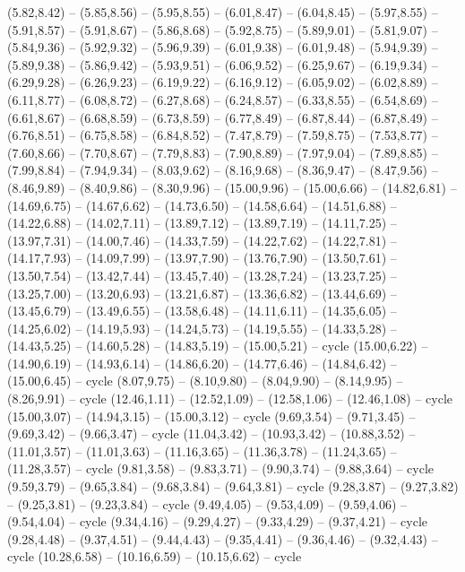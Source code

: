 {(5.82,8.42) -- (5.85,8.56) -- (5.95,8.55) -- (6.01,8.47) -- (6.04,8.45) -- (5.97,8.55) -- (5.91,8.57) -- (5.91,8.67) -- (5.86,8.68) -- (5.92,8.75) -- (5.89,9.01) -- (5.81,9.07) -- (5.84,9.36) -- (5.92,9.32) -- (5.96,9.39) -- (6.01,9.38) -- (6.01,9.48) -- (5.94,9.39) -- (5.89,9.38) -- (5.86,9.42) -- (5.93,9.51) -- (6.06,9.52) -- (6.25,9.67) -- (6.19,9.34) -- (6.29,9.28) -- (6.26,9.23) -- (6.19,9.22) -- (6.16,9.12) -- (6.05,9.02) -- (6.02,8.89) -- (6.11,8.77) -- (6.08,8.72) -- (6.27,8.68) -- (6.24,8.57) -- (6.33,8.55) -- (6.54,8.69) -- (6.61,8.67) -- (6.68,8.59) -- (6.73,8.59) -- (6.77,8.49) -- (6.87,8.44) -- (6.87,8.49) -- (6.76,8.51) -- (6.75,8.58) -- (6.84,8.52) -- (7.47,8.79) -- (7.59,8.75) -- (7.53,8.77) -- (7.60,8.66) -- (7.70,8.67) -- (7.79,8.83) -- (7.90,8.89) -- (7.97,9.04) -- (7.89,8.85) -- (7.99,8.84) -- (7.94,9.34) -- (8.03,9.62) -- (8.16,9.68) -- (8.36,9.47) -- (8.47,9.56) -- (8.46,9.89) -- (8.40,9.86) -- (8.30,9.96) -- (15.00,9.96) -- (15.00,6.66) -- (14.82,6.81) -- (14.69,6.75) -- (14.67,6.62) -- (14.73,6.50) -- (14.58,6.64) -- (14.51,6.88) -- (14.22,6.88) -- (14.02,7.11) -- (13.89,7.12) -- (13.89,7.19) -- (14.11,7.25) -- (13.97,7.31) -- (14.00,7.46) -- (14.33,7.59) -- (14.22,7.62) -- (14.22,7.81) -- (14.17,7.93) -- (14.09,7.99) -- (13.97,7.90) -- (13.76,7.90) -- (13.50,7.61) -- (13.50,7.54) -- (13.42,7.44) -- (13.45,7.40) -- (13.28,7.24) -- (13.23,7.25) -- (13.25,7.00) -- (13.20,6.93) -- (13.21,6.87) -- (13.36,6.82) -- (13.44,6.69) -- (13.45,6.79) -- (13.49,6.55) -- (13.58,6.48) -- (14.11,6.11) -- (14.35,6.05) -- (14.25,6.02) -- (14.19,5.93) -- (14.24,5.73) -- (14.19,5.55) -- (14.33,5.28) -- (14.43,5.25) -- (14.60,5.28) -- (14.83,5.19) -- (15.00,5.21) -- cycle
  (15.00,6.22) -- (14.90,6.19) -- (14.93,6.14) -- (14.86,6.20) -- (14.77,6.46) -- (14.84,6.42) -- (15.00,6.45) -- cycle
  (8.07,9.75) -- (8.10,9.80) -- (8.04,9.90) -- (8.14,9.95) -- (8.26,9.91) -- cycle
  (12.46,1.11) -- (12.52,1.09) -- (12.58,1.06) -- (12.46,1.08) -- cycle
  (15.00,3.07) -- (14.94,3.15) -- (15.00,3.12) -- cycle
  (9.69,3.54) -- (9.71,3.45) -- (9.69,3.42) -- (9.66,3.47) -- cycle
  (11.04,3.42) -- (10.93,3.42) -- (10.88,3.52) -- (11.01,3.57) -- (11.01,3.63) -- (11.16,3.65) -- (11.36,3.78) -- (11.24,3.65) -- (11.28,3.57) -- cycle
  (9.81,3.58) -- (9.83,3.71) -- (9.90,3.74) -- (9.88,3.64) -- cycle
  (9.59,3.79) -- (9.65,3.84) -- (9.68,3.84) -- (9.64,3.81) -- cycle
  (9.28,3.87) -- (9.27,3.82) -- (9.25,3.81) -- (9.23,3.84) -- cycle
  (9.49,4.05) -- (9.53,4.09) -- (9.59,4.06) -- (9.54,4.04) -- cycle
  (9.34,4.16) -- (9.29,4.27) -- (9.33,4.29) -- (9.37,4.21) -- cycle
  (9.28,4.48) -- (9.37,4.51) -- (9.44,4.43) -- (9.35,4.41) -- (9.36,4.46) -- (9.32,4.43) -- cycle
  (10.28,6.58) -- (10.16,6.59) -- (10.15,6.62) -- cycle}

